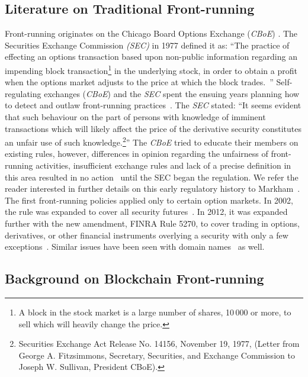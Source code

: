 \subsection{Literature on Traditional Front-running}\label{traditionalFrontrunning}
Front-running originates on the Chicago Board Options Exchange (\textit{CBoE}) \cite{markham1988front}. The Securities Exchange Commission \textit{(SEC)} in 1977 defined it as: ``The practice of effecting an options transaction based upon non-public information regarding an impending block transaction\footnote{A block in the stock market is a large number of shares, 10\,000 or more, to sell which will heavily change the price.} in the underlying stock, in order to obtain a profit when the options market adjusts to the price at which the block trades.~\cite{sec1978optionsmarket}'' Self-regulating exchanges (\eg \textit{CBoE}) and the \textit{SEC} spent the ensuing years planning how to detect and outlaw front-running practices~\cite{markham1988front}. The \textit{SEC} stated: ``It seems evident that such behaviour on the part of persons with knowledge of imminent transactions which will likely affect the price of the derivative security constitutes an unfair use of such knowledge.\footnote{Securities Exchange Act Release No. 14156, November 19, 1977, (Letter from George A. Fitzsimmons, Secretary, Securities, and Exchange Commission to Joseph W. Sullivan, President  CBoE).}'' The \textit{CBoE} tried to educate their members on existing rules, however, differences in opinion regarding the unfairness of front-running activities, insufficient exchange rules and lack of a precise definition in this area resulted in no action~\cite{sec1978optionsmarket} until the SEC began the regulation. We refer the reader interested in further details on this early regulatory history to Markham~\cite{markham1988front}. The first front-running policies applied only to certain option markets. In 2002, the rule was expanded to cover all security futures~\cite{finra_2002}. In 2012, it was expanded further with the new amendment, FINRA Rule 5270, to cover trading in options, derivatives, or other financial instruments overlying a security with only a few exceptions~\cite{sec2012frontrunning,finra_2012}. Similar issues have been seen with domain names~\cite{sac022en33:online,edelman2009front} as well.


\subsection{Background on Blockchain Front-running} \label{sec:Front Running on the Blockchains}

